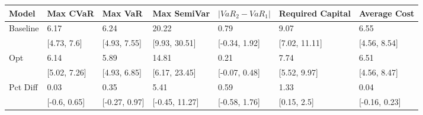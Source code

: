 \begin{tabular}{lllllll}
\toprule
   Model &     Max CVaR &       Max VaR &    Max SemiVar & $|VaR_2 - VaR_1|$ & Required Capital &  Average Cost \\
\midrule
Baseline &         6.17 &          6.24 &          20.22 &              0.79 &             9.07 &          6.55 \\
         &  [4.73, 7.6] &  [4.93, 7.55] &  [9.93, 30.51] &     [-0.34, 1.92] &    [7.02, 11.11] &  [4.56, 8.54] \\
     Opt &         6.14 &          5.89 &          14.81 &              0.21 &             7.74 &          6.51 \\
         & [5.02, 7.26] &  [4.93, 6.85] &  [6.17, 23.45] &     [-0.07, 0.48] &     [5.52, 9.97] &  [4.56, 8.47] \\
Pct Diff &         0.03 &          0.35 &           5.41 &              0.59 &             1.33 &          0.04 \\
         & [-0.6, 0.65] & [-0.27, 0.97] & [-0.45, 11.27] &     [-0.58, 1.76] &      [0.15, 2.5] & [-0.16, 0.23] \\
\bottomrule
\end{tabular}
